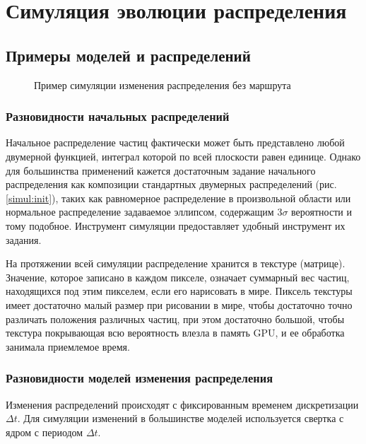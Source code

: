 
\chapter{Симуляция эволюции распределения}
\section{Примеры моделей и распределений}
\begin{figure}[ht]
  \begin{center}
  \end{center}
  \caption{Пример симуляции изменения распределения без маршрута}
\end{figure}

\FloatBarrier
\subsection{Разновидности начальных распределений}
Начальное распределение частиц фактически может быть представлено любой двумерной функцией,
интеграл которой по всей плоскости равен единице. Однако для большинства применений кажется
достаточным задание начального распределения как композиции стандартных двумерных распределений
(рис. \ref{simul:init}), таких как равномерное распределение в произвольной области или
 нормальное распределение задаваемое эллипсом, содержащим $3\sigma$ вероятности и тому подобное.
 Инструмент симуляции предоставляет удобный инструмент их задания.

На протяжении всей симуляции распределение хранится в текстуре (матрице). Значение, которое
записано в каждом пикселе, означает суммарный вес частиц, находящихся под этим пикселем,
если его нарисовать в мире. Пиксель текстуры имеет достаточно малый размер при рисовании в мире,
чтобы достаточно точно различать положения различных частиц, при этом достаточно большой,
чтобы текстура покрывающая всю вероятность влезла в память GPU, и ее обработка занимала
приемлемое время. \FloatBarrier
\subsection{Разновидности моделей изменения распределения}
Изменения распределений происходят с фиксированным временем дискретизации $\Delta t$.
Для симуляции изменений в большинстве моделей используется свертка с ядром с периодом $\Delta t$.


